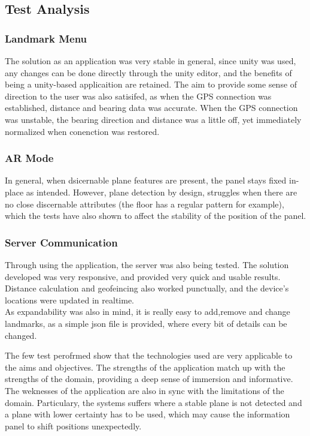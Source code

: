 
\subsection{Test Analysis}
\subsubsection{Landmark Menu}
The solution as an application was very stable in general, since unity was used, any changes can be done directly through the unity editor, and the benefits of being a 
unity-based applicaition are retained. The aim to provide some sense of direction to the user was also satisifed, as when the GPS connection was established, distance 
and bearing data was accurate. When the GPS connection was unstable, the bearing direction and distance was a little off, yet immediately normalized when conenction was restored. 
\subsubsection{AR Mode}
In general, when dsicernable plane features are present, the panel stays fixed in-place as intended.
However, plane detection by design, struggles when there are no close discernable attributes (the floor has a regular pattern for example), which the tests 
have also shown to affect the stability of the position of the panel.
\subsubsection{Server Communication}
Through using the application, the server was also being tested. The solution developed was very responsive, and provided very quick and usable results. 
Distance calculation and geofeincing also worked punctually, and the device's locations were updated in realtime.\\
As expandability was also in mind, it is really easy to add,remove and change landmarks, as a simple json file is provided, where every bit of details can be changed.

The few test perofrmed show that the technologies used are very applicable to the aims and objectives. The strengths of the application match up with the strengths of the domain, 
providing a deep sense of immersion and informative. The weknesses of the application are also in sync with the limitations of the domain. Particulary, the systems suffers where a stable 
plane is not detected and a plane with lower certainty has to be used, which may cause the information panel to shift positions unexpectedly. 

